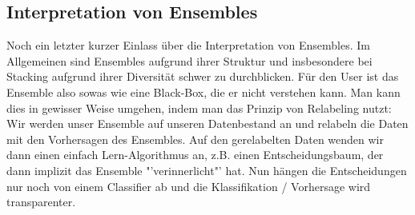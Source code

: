 \subsection{Interpretation von Ensembles}
Noch ein letzter kurzer Einlass über die Interpretation von Ensembles.
Im Allgemeinen sind Ensembles aufgrund ihrer Struktur und insbesondere bei
Stacking aufgrund ihrer Diversität schwer zu durchblicken. Für den User
ist das Ensemble also sowas wie eine Black-Box, die er nicht verstehen kann.
Man kann dies in gewisser Weise umgehen, indem man das Prinzip von 
Relabeling nutzt: Wir werden unser Ensemble auf unseren Datenbestand an
und relabeln die Daten mit den Vorhersagen des Ensembles. Auf den gerelabelten
Daten wenden wir dann einen einfach Lern-Algorithmus an, z.B. einen
Entscheidungsbaum, der dann implizit das Ensemble "'verinnerlicht"' hat. Nun
hängen die Entscheidungen nur noch von einem Classifier ab und die
Klassifikation / Vorhersage wird transparenter.